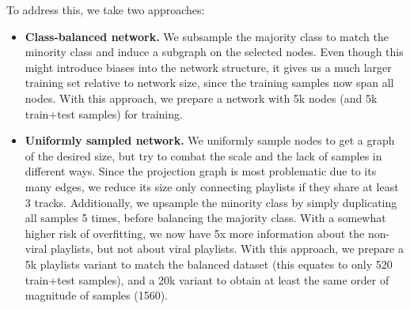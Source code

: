 \documentclass[9pt,twocolumn,twoside]{pnas-report}
\begin{document}
To address this, we take two approaches:
\begin{itemize}
    \item \textbf{Class-balanced network.} We subsample the majority class to match the minority class and induce a subgraph on the selected nodes. Even though this might introduce biases into the network structure, it gives us a much larger training set relative to network size, since the training samples now span all nodes. With this approach, we prepare a network with 5k nodes (and 5k train+test samples) for training.
    \item \textbf{Uniformly sampled network.} We uniformly sample nodes to get a graph of the desired size, but try to combat the scale and the lack of samples in different ways. Since the projection graph is most problematic due to its many edges, we reduce its size only connecting playlists if they share at least 3 tracks. Additionally, we upsample the minority class by simply duplicating all samples 5 times, before balancing the majority class. With a somewhat higher risk of overfitting, we now have 5x more information about the non-viral playlists, but not about viral playlists. With this approach, we prepare a 5k playlists variant to match the balanced dataset (this equates to only 520 train+test samples), and a 20k variant to obtain at least the same order of magnitude of samples (1560).
\end{itemize}





\end{document}
